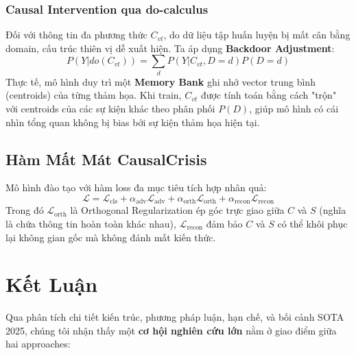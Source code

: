 \documentclass[12pt,a4paper]{article}
\begin{document}
\subsubsection{Causal Intervention qua do-calculus}
Đối với thông tin đa phương thức $C_{vt}$, do dữ liệu tập huấn luyện bị mất cân bằng domain, cấu trúc thiên vị dễ xuất hiện. Ta áp dụng \textbf{Backdoor Adjustment}:
\begin{equation}
P(Y | do(C_{vt})) = \sum_{d} P(Y | C_{vt}, D=d) P(D=d)
\end{equation}
Thực tế, mô hình duy trì một \textbf{Memory Bank} ghi nhớ vector trung bình (centroids) của từng thảm họa. Khi train, $C_{vt}$ được tính toán bằng cách "trộn" với centroids của các sự kiện khác theo phân phối $P(D)$, giúp mô hình có cái nhìn tổng quan không bị bias bởi sự kiện thảm họa hiện tại.

\subsection{Hàm Mất Mát CausalCrisis}
Mô hình đào tạo với hàm loss đa mục tiêu tích hợp nhân quả:
\begin{equation}
\mathcal{L} = \mathcal{L}_{\text{cls}} + \alpha_{\text{adv}} \mathcal{L}_{\text{adv}} + \alpha_{\text{orth}} \mathcal{L}_{\text{orth}} + \alpha_{\text{recon}} \mathcal{L}_{\text{recon}}
\end{equation}
Trong đó $\mathcal{L}_{\text{orth}}$ là Orthogonal Regularization ép góc trực giao giữa $C$ và $S$ (nghĩa là chứa thông tin hoàn toàn khác nhau), $\mathcal{L}_{\text{recon}}$ đảm bảo $C$ và $S$ có thể khôi phục lại không gian gốc mà không đánh mất kiến thức.

\section{Kết Luận}

Qua phân tích chi tiết kiến trúc, phương pháp luận, hạn chế, và bối cảnh SOTA 2025, chúng tôi nhận thấy một \textbf{cơ hội nghiên cứu lớn} nằm ở giao điểm giữa hai approaches:
\end{document}
